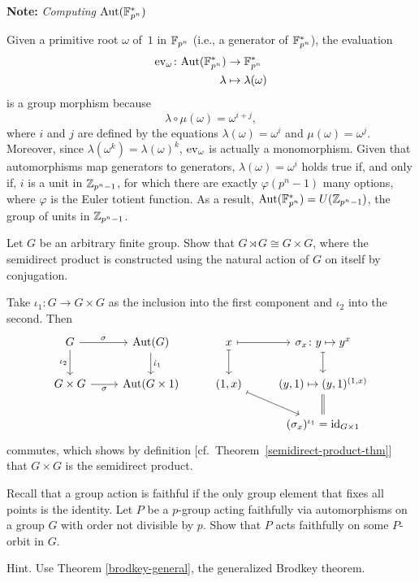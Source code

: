 \medskip


\needspace{2\lineskip}
\textbf{Note:} \textit{Computing\/ ${\rm Aut}(\mathbb{F}_{p^{n}}^*)$}

Given a primitive root $\omega$ of~$1$ in $\mathbb{F}_{p^{n}}$ (i.e., a generator of $\mathbb{F}_{p^{n}}^*$), the evaluation
\begin{align*}
    {\rm ev}_{\omega}\colon{\rm Aut}(\mathbb{F}_{p^{n}}^*)&\to\mathbb{F}_{p^{n}}^*\\
    \lambda&\mapsto \lambda(\omega)
\end{align*}
is a group morphism because
$$
    \lambda\circ\mu(\omega)=\omega^{i+j},
$$
where $i$ and $j$ are defined by the equations $\lambda(\omega)=\omega^i$ and $\mu(\omega)=\omega^j$. Moreover, since $\lambda(\omega^k)=\lambda(\omega)^k$, ${\rm ev}_{\omega}$ is actually a monomorphism. Given that automorphisms map generators to generators, $\lambda(\omega)=\omega^i$ holds true if, and only if, $i$ is a unit in $\mathbb{Z}_{p^n-1}$, for which there are exactly $\varphi(p^n-1)$ many options, where $\varphi$ is the Euler totient function. As a result, ${\rm Aut}(\mathbb{F}_{p^{n}}^*)=U(\mathbb{Z}_{p^n-1})$, the group of units in $\mathbb{Z}_{p^n-1}$.

\begin{probl}
    Let\/ $G$ be an arbitrary finite group. Show that\/ $G \rtimes G \cong G \times G$, where the semidirect product is constructed using the natural action of\/ $G$ on itself by conjugation.
\end{probl}

\begin{solution} Take $\iota_1\colon G\to G\times G$ as the inclusion into the first component and $\iota_2$ into the second. Then
$$
    \begin{tikzcd}
        G \arrow[d,"\iota_2"']\arrow[r,"\sigma"]
            &\Aut(G)\arrow[d, "\hat\iota_1"]
            &x \arrow[d, maps to] \arrow[r, maps to]
            &\sigma_x\colon y\mapsto y^x \arrow[d, maps to] \\
        G\times G\arrow[r,"\sigma"']
            &\Aut(G\times 1)
            &{(1,x)}\arrow[rd, maps to]
            &{(y,1)\mapsto(y,1)^{(1,x)}}\\
        &&&(\sigma_x)^{\iota_1}=\id_{G\times1}\arrow[u,equal]
    \end{tikzcd}
$$
commutes, which shows by definition [cf.~Theorem~\ref{semidirect-product-thm}] that $G\times G$ is the semidirect product.  \end{solution}

\begin{probl}
    Recall that a group action is faithful if the only group element that fixes all points is the identity. Let\/ $P$ be a\/ $p$-group acting faithfully via automorphisms on a group\/ $G$ with order not divisible by\/ $p$. Show that\/ $P$ acts faithfully on some\/ $P$-orbit in\/ $G$.

    \textrm{\upshape Hint. Use Theorem \ref{brodkey-general}, the generalized Brodkey theorem.}
\end{probl}


